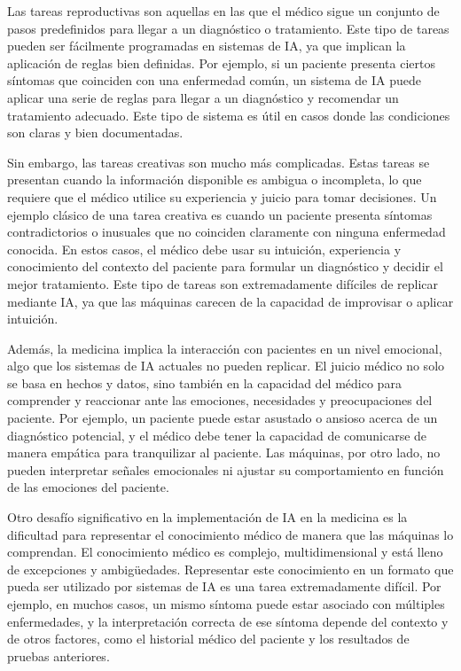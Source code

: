 \documentclass[a4paper,10pt]{article}
\begin{document}
Las tareas reproductivas son aquellas en las que el médico sigue un conjunto de pasos predefinidos para llegar a un diagnóstico o tratamiento. Este tipo de tareas pueden ser fácilmente programadas en sistemas de IA, ya que implican la aplicación de reglas bien definidas. Por ejemplo, si un paciente presenta ciertos síntomas que coinciden con una enfermedad común, un sistema de IA puede aplicar una serie de reglas para llegar a un diagnóstico y recomendar un tratamiento adecuado. Este tipo de sistema es útil en casos donde las condiciones son claras y bien documentadas.\vspace{1cm}

Sin embargo, las tareas creativas son mucho más complicadas. Estas tareas se presentan cuando la información disponible es ambigua o incompleta, lo que requiere que el médico utilice su experiencia y juicio para tomar decisiones. Un ejemplo clásico de una tarea creativa es cuando un paciente presenta síntomas contradictorios o inusuales que no coinciden claramente con ninguna enfermedad conocida. En estos casos, el médico debe usar su intuición, experiencia y conocimiento del contexto del paciente para formular un diagnóstico y decidir el mejor tratamiento. Este tipo de tareas son extremadamente difíciles de replicar mediante IA, ya que las máquinas carecen de la capacidad de improvisar o aplicar intuición.\vspace{1cm}

Además, la medicina implica la interacción con pacientes en un nivel emocional, algo que los sistemas de IA actuales no pueden replicar. El juicio médico no solo se basa en hechos y datos, sino también en la capacidad del médico para comprender y reaccionar ante las emociones, necesidades y preocupaciones del paciente. Por ejemplo, un paciente puede estar asustado o ansioso acerca de un diagnóstico potencial, y el médico debe tener la capacidad de comunicarse de manera empática para tranquilizar al paciente. Las máquinas, por otro lado, no pueden interpretar señales emocionales ni ajustar su comportamiento en función de las emociones del paciente.\vspace{1cm}

Otro desafío significativo en la implementación de IA en la medicina es la dificultad para representar el conocimiento médico de manera que las máquinas lo comprendan. El conocimiento médico es complejo, multidimensional y está lleno de excepciones y ambigüedades. Representar este conocimiento en un formato que pueda ser utilizado por sistemas de IA es una tarea extremadamente difícil. Por ejemplo, en muchos casos, un mismo síntoma puede estar asociado con múltiples enfermedades, y la interpretación correcta de ese síntoma depende del contexto y de otros factores, como el historial médico del paciente y los resultados de pruebas anteriores.\vspace{1cm}
\end{document}
